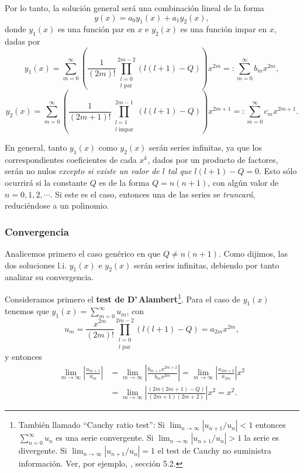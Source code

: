Por lo tanto, la solución general será una combinación lineal de la forma
\begin{equation}
y(x)=a_0y_1(x)+a_1y_2(x),
\end{equation}
donde $y_1(x)$ es una función par en $x$ e $y_2(x)$ es una función impar en $x$, dadas por
\begin{equation}
y_1(x) = \sum_{m= 0}^\infty \left(\frac{1}{(2m)!}
\prod_{\substack{l=0 \\ l \text{ par}}}^{2m-2}
\left( l (l+1) -Q \right) \right) x^{2m}=:\sum_{m= 0}^\infty b_m x^{2m}, \label{y1}
\end{equation}
\begin{equation}
y_2(x) = \sum_{m=0}^\infty\left( \frac{1}{(2m+1)!}
\prod_{\substack{l=1 \\ l \text{ impar}}}^{2m-1}
\left( l (l+1) - Q \right) \right) x^{2m+1}
=:\sum_{m= 0}^\infty c_m x^{2m+1}. \label{y2}
\end{equation}

En general, tanto $y_1(x)$ como $y_2(x)$ serán series infinitas, ya que los correspondientes coeficientes de cada $x^k$, dados por un producto de factores, serán no nulos \textit{excepto si existe un valor de $l$ tal que} $l(l+1)-Q=0$. Esto sólo ocurrirá si la constante $Q$ es de la forma $Q=n(n+1)$, con algún valor de $n=0,1,2,\cdots$. Si este es el caso, entonces una de las series se \textit{truncará}, reduciéndose a un polinomio.

\subsubsection{Convergencia}
Analicemos primero el caso genérico en que $Q\neq n(n+1)$. Como dijimos, las dos soluciones l.i. $y_1(x)$ e $y_2(x)$ serán series infinitas, debiendo por tanto analizar su convergencia.

Consideramos primero el \textbf{test de D'\,Alambert}\footnote{También llamado ``Cauchy ratio test'': Si $\lim_{n\to\infty}\left|u_{n+1}/u_n\right|<1$ entonces $\sum_{n=0}^\infty u_n$ es una serie convergente. Si $\lim_{n\to\infty}\left|u_{n+1}/u_n\right|>1$ la serie es divergente. Si $\lim_{n\to\infty}\left|u_{n+1}/u_n\right|=1$ el test de Cauchy no suministra información. Ver, por ejemplo, \cite{Arfken}, sección 5.2.}. Para el caso de $y_1(x)$ tenemos que $y_1(x)=\sum_{m=0}^\infty u_m$, con 
\begin{equation}
u_m=\frac{x^{2m}}{(2m)!}
\prod_{\substack{l=0 \\ l \text{ par}}}^{2m-2}
\left( l (l+1) -Q \right)=a_{2m}x^{2m},
\end{equation}
y entonces
\begin{align}
\lim_{m\to\infty}\left|\frac{u_{m+1}}{u_m}\right| 
&=\lim_{m\to\infty}\left|\frac{b_{m+1}x^{2m+2}}{b_mx^{2m}}\right|
= \lim_{m\to\infty}\left|\frac{a_{2m+2}}{a_{2m}}\right| x^2 \\
&= \lim_{m\to\infty}\left|\frac{(2m(2m+1)-Q)}{(2m+1)(2m+2)}\right| x^2
= x^2.
\end{align}

